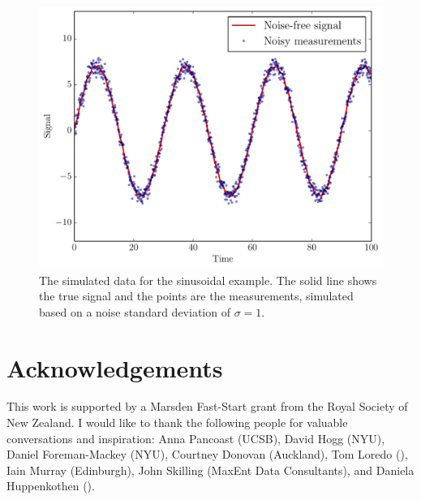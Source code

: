 \documentclass[letterpaper, 11pt]{article}
\begin{document}
\begin{figure}
\begin{center}
\includegraphics[scale=0.5]{sinewave_data.pdf}
\caption{The simulated data for the sinusoidal example. The solid line shows
the true signal and the points are the measurements, simulated based on a
noise standard deviation of $\sigma = 1$.
\label{fig:sinewave_data}}
\end{center}
\end{figure}






\section*{Acknowledgements}
This work is supported by a Marsden Fast-Start grant
from the Royal Society of New Zealand. I would like to thank the following
people for valuable conversations and inspiration:
Anna Pancoast (UCSB), David Hogg (NYU), Daniel Foreman-Mackey (NYU),
Courtney Donovan (Auckland), Tom Loredo (), Iain Murray (Edinburgh),
John Skilling (MaxEnt Data Consultants), and Daniela Huppenkothen ().
\end{document}
